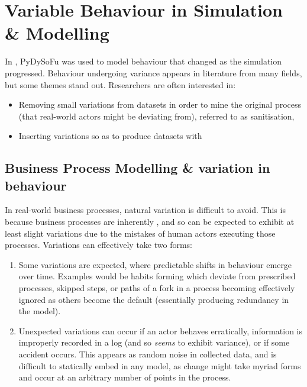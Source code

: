 \section{Variable Behaviour in Simulation \& Modelling}\label{sec:dynamism_in_sm}

In \cite{wallis2018caise}, PyDySoFu was used to model behaviour that changed as
the simulation progressed. Behaviour undergoing variance appears in literature
from many fields, but some themes stand out. Researchers are often interested
in:

\begin{itemize}
    \item Removing small variations from datasets in order to mine the original
    process (that real-world actors might be deviating from), referred to as
    sanitisation,
    \item Inserting variations so as to produce datasets with 
\end{itemize}

\subsection{Business Process Modelling \& variation in behaviour}

In real-world business processes, natural variation is difficult to avoid. This
is because business processes are inherently \sociotechnical, and so can be
expected to exhibit at least slight variations due to the mistakes of human
actors executing those processes. Variations can effectively take two forms:

\begin{enumerate}
    \item Some variations are expected, where predictable shifts in behaviour
    emerge over time. Examples would be habits forming which deviate from
    prescribed processes, skipped steps, or paths of a fork in a process
    becoming effectively ignored as others become the default (essentially
    producing redundancy in the model).
    \item Unexpected variations can occur if an actor behaves erratically,
    information is improperly recorded in a log (and so \emph{seems} to exhibit
    variance), or if some accident occurs. This appears as random noise in
    collected data, and is difficult to statically embed in any model, as change
    might take myriad forms and occur at an arbitrary number of points in the
    process.
\end{enumerate}


